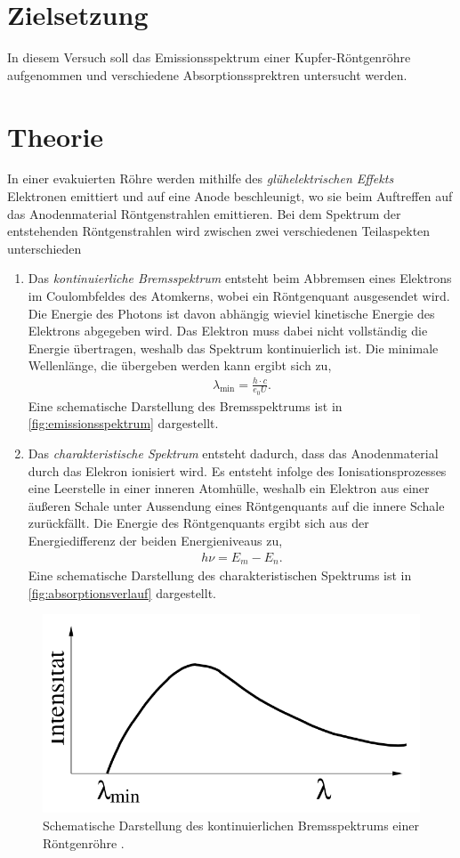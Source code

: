 \section{Zielsetzung}
\label{sec:ziel}
In diesem Versuch soll das Emissionsspektrum einer Kupfer-Röntgenröhre aufgenommen und verschiedene Absorptionssprektren untersucht werden.

\section{Theorie}
\label{sec:Theorie}
In einer evakuierten Röhre werden mithilfe des \textit{glühelektrischen Effekts} Elektronen emittiert und auf eine Anode beschleunigt, wo sie beim Auftreffen
auf das Anodenmaterial Röntgenstrahlen emittieren. Bei dem Spektrum der entstehenden Röntgenstrahlen wird zwischen zwei verschiedenen Teilaspekten unterschieden
\begin{enumerate}
    \item Das \textit{kontinuierliche Bremsspektrum} entsteht beim Abbremsen eines Elektrons im Coulombfeldes des Atomkerns, wobei ein Röntgenquant ausgesendet wird. Die Energie des Photons
    ist davon abhängig wieviel kinetische Energie des Elektrons abgegeben wird. Das Elektron muss dabei nicht vollständig die Energie übertragen, weshalb das Spektrum kontinuierlich ist.
    Die minimale Wellenlänge, die übergeben werden kann ergibt sich zu,
    \begin{align}
        \label{eqn:wellenlaenge}
        \lambda_{\text{min}} = \frac{h\cdot c}{e_0 U}.
    \end{align}
    Eine schematische Darstellung des Bremsspektrums ist in \autoref{fig:emissionsspektrum} dargestellt.
    \item Das \textit{charakteristische Spektrum} entsteht dadurch, dass das Anodenmaterial durch das Elekron ionisiert wird. Es entsteht infolge des Ionisationsprozesses eine Leerstelle in einer inneren
    Atomhülle, weshalb ein Elektron aus einer äußeren Schale unter Aussendung eines Röntgenquants auf die innere Schale zurückfällt. Die Energie des Röntgenquants ergibt sich aus der Energiedifferenz
    der beiden Energieniveaus zu,
    \begin{align}
        \label{eqn:energiedifferenz}
        h \nu = E_m - E_n.
    \end{align}
    Eine schematische Darstellung des charakteristischen Spektrums ist in \autoref{fig:absorptionsverlauf} dargestellt.
\end{enumerate}
\begin{figure}[H]
    \centering
    \includegraphics[width = 0.5 \textwidth]{data/emissionsspektrum.png}
    \caption{Schematische Darstellung des kontinuierlichen Bremsspektrums einer Röntgenröhre \cite{Anleitung602}.}
    \label{fig:emissionsspektrum}
\end{figure}
